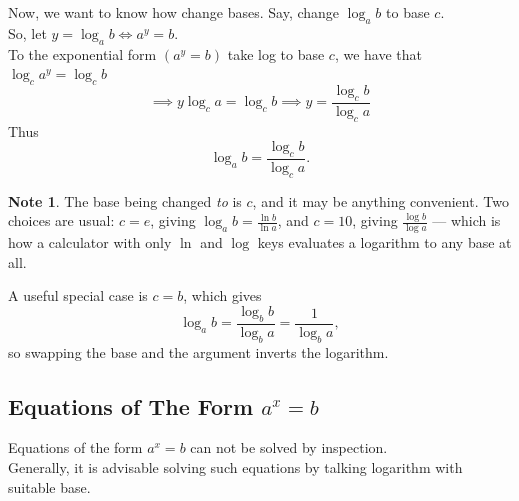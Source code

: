 \documentclass[11pt,a4paper]{article}
\theoremstyle{definition}
\newtheorem{note}[thm]{Note}
\begin{document}
Now, we want to know how change bases. Say, change $\log_{\displaystyle{a}}b$ to base $c$.\\
So, let $y=\log_{\displaystyle{a}}b\iff a^{\displaystyle{y}}=b$.\\

To the exponential form $(a^{\displaystyle{y}}=b)$ take log to base $c$, we have that $\log_{\displaystyle{c}}a^{\displaystyle{y}} =\log_{\displaystyle{c}}b$
$$\implies y\log_{\displaystyle{c}}a=\log_{\displaystyle{c}}b\implies y=\frac{\log_{\displaystyle{c}}b}{\log_{\displaystyle{c}}a}$$
Thus
$$\log_{a}b=\frac{\log_{c}b}{\log_{c}a} .$$

\begin{note}
The base being changed \emph{to} is $c$, and it may be anything convenient. Two
choices are usual: $c=e$, giving $\log_{a}b=\frac{\ln b}{\ln a}$, and $c=10$,
giving $\frac{\log b}{\log a}$ --- which is how a calculator with only $\ln$ and
$\log$ keys evaluates a logarithm to any base at all.

A useful special case is $c=b$, which gives
$$\log_{a}b=\frac{\log_{b}b}{\log_{b}a}=\frac{1}{\log_{b}a},$$
so swapping the base and the argument inverts the logarithm.
\end{note}













\subsection{Equations of The Form $a^x=b$}
Equations of the form $a^{\displaystyle{x}}=b$ can not be solved by inspection.\\

Generally, it is advisable solving such equations  by talking logarithm with suitable base.\\
\end{document}
